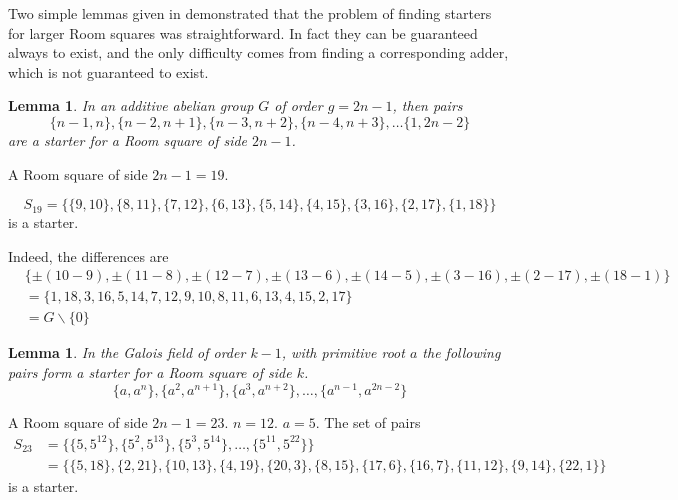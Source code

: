 \documentclass[11pt, a4paper]{book}\usepackage[]{graphicx}\usepackage[]{xcolor}
\newcounter{example}
\newtheorem{lemma}[theorem]{Lemma}
\begin{document}
Two simple lemmas given in
\cite{stantonConstructionRoomSquares1968}
demonstrated that the problem of finding starters for larger
Room squares was straightforward. In fact they can be
guaranteed always to exist, and the only difficulty comes
from finding a corresponding adder, which is not guaranteed
to exist.

\begin{lemma}
In an additive abelian group $G$ of order $g = 2n-1$,
then pairs
\begin{equation*}
  \{n - 1, n\}, \{n - 2, n + 1\}, \{n - 3, n + 2\}, \{n - 4, n + 3\}, \ldots\{1, 2n - 2\}
\end{equation*}
are a starter for a Room square of side $2n - 1$.
\end{lemma}

\begin{example}
A Room square of side $2n - 1 = 19$.

\begin{equation*}
S_{19} = \{\{9, 10\}, \{8, 11\}, \{7, 12\}, \{6, 13\}, \{5, 14\}, \{4, 15\}, \{3, 16\}, \{2, 17\}, \{1, 18\}\}
\end{equation*}
is a starter.

Indeed, the differences are
\begin{equation*}
\begin{split}
  & \{\pm(10 - 9), \pm(11 - 8), \pm(12 - 7), \pm(13 - 6), \pm(14 - 5), \pm(3 - 16), \pm(2 - 17), \pm(18 - 1)\} \\ 
  &= \{1, 18, 3, 16, 5, 14, 7, 12, 9, 10, 8, 11, 6, 13, 4, 15, 2, 17\} \\
  &= G \backslash \{0\}
\end{split}
\end{equation*}
\end{example}

\begin{lemma}
In the Galois field of order $k - 1$, with primitive root
$a$ the following pairs form a starter for a Room square of
side $k$.
\begin{equation}
  \{a, a^n\}, \{a^2, a^{n + 1}\}, \{a^3, a^{n + 2}\}, \ldots, \{a^{n - 1}, a^{2n - 2}\}
\end{equation}
\end{lemma}

\begin{example}
A Room square of side $2n - 1 = 23$. $n = 12$. $a = 5$.
The set of pairs
\begin{equation*}
\begin{split}
S_{23} &= \{\{5, 5^{12}\}, \{5^2, 5^{13}\}, \{5^3, 5^{14}\}, \ldots, \{5^{11}, 5^{22}\}\} \\
       &= \{\{5, 18\}, \{2, 21\}, \{10, 13\}, \{4, 19\}, \{20, 3\}, \{8, 15\}, \{17, 6\}, \{16, 7\}, \{11, 12\}, \{9, 14\}, \{22, 1\}\}
\end{split}
\end{equation*}
is a starter.
\end{example}
\end{document}

